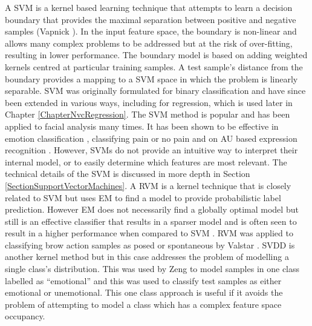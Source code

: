A \acf{SVM} is a kernel based learning technique that attempts to learn a decision boundary that provides the maximal separation between positive and negative samples (Vapnick \cite{Vapnik1998}). In the input feature space, the boundary is non-linear and allows many complex problems to be addressed but at the risk of over-fitting, resulting in lower performance. The boundary model is based on adding weighted kernels centred at particular training samples. A test sample's distance from the boundary provides a mapping to a SVM space in which the problem is linearly separable. \ac{SVM} was originally formulated for binary classification and have since been extended in various ways, including for regression, which is used later in Chapter \ref{ChapterNvcRegression}.
The \ac{SVM} method is popular and has been applied to facial analysis many times. It has been shown to be effective in emotion classification \cite{Goecke2006, Datcu2007, Seppi2008, Moore2009, Truong2009, Tariq2011, Jeni2011, Yang2011}, classifying pain or no pain \cite{Ashraf2007} and on \ac{AU} based expression recognition \cite{Taheri2011, Girard2011}. However, \ac{SVM}s do not provide an intuitive way to interpret their internal model, or to easily determine which features are most relevant. The technical details of the \ac{SVM} is discussed in more depth in Section \ref{SectionSupportVectorMachines}. A \acf{RVM} is a kernel technique that is closely related to \ac{SVM} but uses \ac{EM} to find a model to provide probabilistic label prediction. However \ac{EM} does not necessarily find a globally optimal model but still is an effective classifier that results in a sparser model and is often seen to result in a higher performance when compared to \ac{SVM} \cite{Nicolaou2011b, Xiangmin2007}. \ac{RVM} was applied to classifying brow action samples as posed or spontaneous by Valstar \etal \cite{Valstar2006}. \acf{SVDD} is another kernel method but in this case addresses the problem of modelling a single class's distribution. This was used by Zeng \etal \cite{Zeng2006} to model samples in one class labelled as ``emotional'' and this was used to classify test samples as either emotional or unemotional. This one class approach is useful if it avoids the problem of attempting to model a class which has a  complex feature space occupancy.


